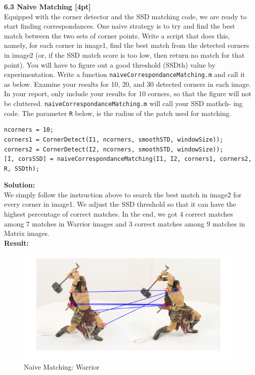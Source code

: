 \documentclass{assignment}
\begin{document}
\begin{problemlist}
\textbf{6.3 Naive Matching [4pt]}\\
Equipped with the corner detector and the SSD matching code, we are ready to start finding correspondances. One naive strategy is to try and find the best match between the two sets of corner points. Write a script that does this, namely, for each corner in image1, find the best match from the detected corners in image2 (or, if the SSD match score is too low, then return no match for that point). You will have to figure out a good threshold (SSDth) value by experimentation. Write a function \texttt{naiveCorrespondanceMatching.m} and call it as below. Examine your results for 10, 20, and 30 detected corners in each image. In your report, only include your results for 10 corners, so that the figure will not be cluttered. \texttt{naiveCorrespondanceMatching.m} will call your SSD mathch- ing code. The parameter \texttt{R} below, is the radius of the patch used for matching.\\
\begin{lstlisting}
ncorners = 10;
corners1 = CornerDetect(I1, ncorners, smoothSTD, windowSize));
corners2 = CornerDetect(I2, ncorners, smoothSTD, windowSize));
[I, corsSSD] = naiveCorrespondanceMatching(I1, I2, corners1, corners2, R, SSDth);
\end{lstlisting}
\textbf{Solution:}\\
We simply follow the instruction above to search the best match in image2 for every corner in image1. We adjust the SSD threshold so that it can have the highest percentage of correct matches. In the end, we got 4 correct matches among 7 matches in Warrior images and 3 correct matches among 9 matches in Matrix images.\\
\newpage
\textbf{Result:}
\begin{figure}[!ht]
\centering
\includegraphics[scale = 1.0]{6_3warrior.png}
\caption{Naive Matching: Warrior}
\end{figure}


\end{problemlist}
\end{document}
